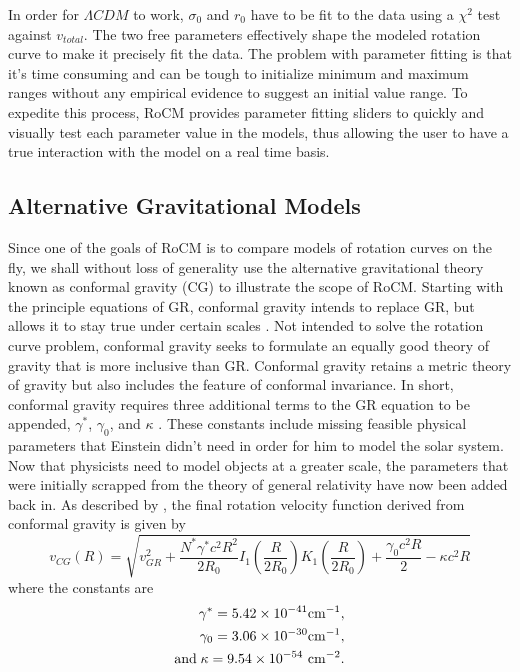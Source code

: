 \documentclass[conference]{IEEEtran-modified}
\providecommand{\e}[1]{\ensuremath{\times 10^{#1}}}
\begin{document}
In order for $\Lambda CDM$ to work, $\sigma_0$ and $r_0$ have to be fit to the data using a $\chi^2$ test against $v_{total}$. The two free parameters effectively shape the modeled rotation curve to make it precisely fit the data. The problem with parameter fitting is that it's time consuming and can be tough to initialize minimum and maximum ranges without any empirical evidence to suggest an initial value range. To expedite this process, RoCM provides parameter fitting sliders to quickly and visually test each parameter value in the models, thus allowing the user to have a true interaction with the model on a real time basis.


\subsection{Alternative Gravitational Models}
Since one of the goals of RoCM is to compare models of rotation curves on the fly, we shall without loss of generality use the alternative gravitational theory known as conformal gravity (CG) to illustrate the scope of RoCM.  Starting with the principle equations of GR, conformal gravity intends to replace GR, but allows it to stay true under certain scales \cite{mannheim}. 
Not intended to solve the rotation curve problem, conformal gravity seeks to formulate an equally good theory of gravity that is more inclusive than GR. Conformal gravity retains a metric theory of gravity but also includes the feature of conformal invariance. In short, conformal gravity requires three additional terms to the GR equation to be appended, $\gamma^*$, $\gamma_0$, and $\kappa$ \cite{mannheim}. These constants include missing feasible physical parameters that Einstein didn't need in order for him to model the solar system. Now that physicists need to model objects at a greater scale, the parameters that were initially scrapped from the theory of general relativity have now been added back in.
 As described by \cite{mannheim}, the final rotation velocity function derived from conformal gravity is given by
\begin{equation}
v_{CG}(R) = \sqrt{v_{GR}^2+\frac{N^*\gamma^*c^2R^2}{2R_0}I_1\left(\frac{R}{2R_0}\right)K_1\left(\frac{R}{2R_0}\right)+\frac{\gamma_0c^2R}{2}-\kappa c^2R}
\end{equation}
where the constants are
\begin{equation*}
\begin{split}
\gamma^*=5.42\e{-41} {\rm cm}^{-1}, \\ 
\gamma_0=3.06\e{-30} {\rm cm}^{-1}, \\ 
\text{and}\; \kappa=9.54\e{-54}~{\rm cm}^{-2}.
\end{split}
\end{equation*} 
\end{document}
